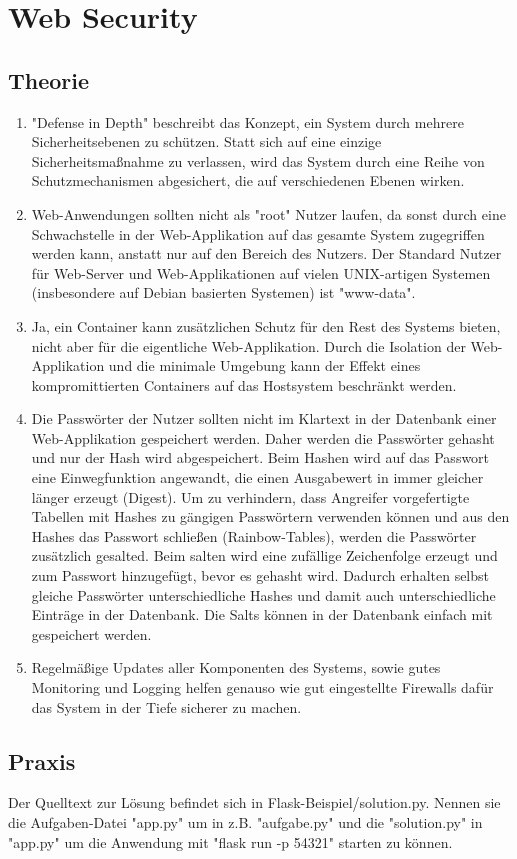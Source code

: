 \documentclass[ngerman]{article}
\begin{document}
\section{Web Security}

\subsection{Theorie}
\begin{enumerate}
    \item "Defense in Depth" beschreibt das Konzept, ein System durch mehrere Sicherheitsebenen zu schützen. Statt sich auf eine einzige Sicherheitsmaßnahme zu verlassen, wird das System durch eine Reihe von Schutzmechanismen abgesichert, die auf verschiedenen Ebenen wirken.
    
    \item Web-Anwendungen sollten nicht als "root" Nutzer laufen, da sonst durch eine Schwachstelle in der Web-Applikation auf das gesamte System zugegriffen werden kann, anstatt nur auf den Bereich des Nutzers. Der Standard Nutzer für Web-Server und Web-Applikationen auf vielen UNIX-artigen Systemen (insbesondere auf Debian basierten Systemen) ist "www-data".
    
    \item Ja, ein Container kann zusätzlichen Schutz für den Rest des Systems bieten, nicht aber für die eigentliche Web-Applikation. Durch die Isolation der Web-Applikation und die minimale Umgebung kann der Effekt eines kompromittierten Containers auf das Hostsystem beschränkt werden.
    
    \item Die Passwörter der Nutzer sollten nicht im Klartext in der Datenbank einer Web-Applikation gespeichert werden. Daher werden die Passwörter gehasht und nur der Hash wird abgespeichert. Beim Hashen wird auf das Passwort eine Einwegfunktion angewandt, die einen Ausgabewert in immer gleicher länger erzeugt (Digest). Um zu verhindern, dass Angreifer vorgefertigte Tabellen mit Hashes zu gängigen Passwörtern verwenden können und aus den Hashes das Passwort schließen (Rainbow-Tables), werden die Passwörter zusätzlich gesalted. Beim salten wird eine zufällige Zeichenfolge erzeugt und zum Passwort hinzugefügt, bevor es gehasht wird. Dadurch erhalten selbst gleiche Passwörter unterschiedliche Hashes und damit auch unterschiedliche Einträge in der Datenbank. Die Salts können in der Datenbank einfach mit gespeichert werden.

    \item Regelmäßige Updates aller Komponenten des Systems, sowie gutes Monitoring und Logging helfen genauso wie gut eingestellte Firewalls dafür das System in der Tiefe sicherer zu machen.
    
\end{enumerate}

\subsection{Praxis}

Der Quelltext zur Lösung befindet sich in Flask-Beispiel/solution.py. Nennen sie die Aufgaben-Datei "app.py" um in z.B. "aufgabe.py" und die "solution.py" in "app.py" um die Anwendung mit "flask run -p 54321" starten zu können. 
\end{document}
